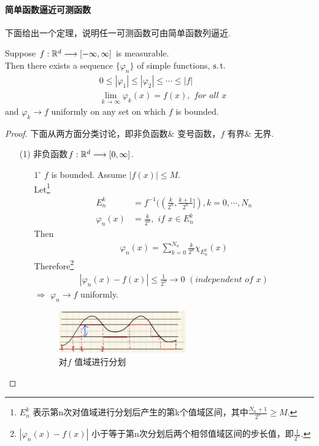 \paragraph{简单函数逼近可测函数}
	下面给出一个定理，说明任一可测函数可由简单函数列逼近.
	\begin{thm}\label{thm 2.2.1}
		Suppose $f : \mathbb{R}^d \longrightarrow [-\infty , \infty]$ is measurable. \\
		Then there exists a sequence $\{ \varphi_n \}$ of simple functions, $\operatorname{s.t.}$
		\begin{align}
			&0 \leq \left| \varphi_1 \right| \leq \left| \varphi_2 \right| \leq \cdots \leq \left| f \right| \\
			&\lim_{k \to \infty}{\varphi_{k}(x)} = f(x) , \,\, for \,\, all \,\, x
		\end{align}
		and $\varphi_k \to f$ uniformly on any set on which $f$ is bounded.
		
		\vspace{2em}
		\begin{proof}
			下面从两方面分类讨论，即非负函数$\&$ 变号函数，$f$ 有界$\&$ 无界.
			\begin{enumerate}
				\item[(1)]非负函数$f : \mathbb{R}^d \longrightarrow [0 , \infty]$.
				\begin{enumerate}
					\item[$1^{\circ}$]$f$ is bounded. Assume $\left| f(x) \right| \leq M$.\\
					Let\footnote{$E_{n}^k$ 表示第n次对值域进行分划后产生的第k个值域区间，其中$\frac{N_n + 1}{2^n} \geq M$.}
					\begin{align}
						E_{n}^{k} &= f^{-1}((\frac{k}{2^n} , \frac{k + 1}{2^n}]) , k = 0 , \cdots , N_n \\
						\varphi_{n}(x) &= \frac{k}{2^n} , \,\, if \,\, x \in E_{n}^{k}
					\end{align}
					Then
					\begin{align}
						\varphi_{n}(x) = \sum_{k = 0}^{N_n}{\frac{k}{2^n} \chi_{E_{n}^{k}}(x)}
					\end{align}
					Therefore\footnote{$\left| \varphi_{n}(x) - f(x) \right|$ 小于等于第n次分划后两个相邻值域区间的步长值，即$\frac{1}{2^n}$.}
					\begin{align}
						\left| \varphi_{n}(x) - f(x) \right| \leq \frac{1}{2^n} \to 0 \,\, (independent \,\, of \,\, x)
					\end{align}
					$\Rightarrow$ $\varphi_{n} \to f$ uniformly.
					
					\begin{figure}[htbp]  %
						\centering  %
						\includegraphics[width=0.55\textwidth]{figure/2.2-1} %
						\caption{对$f$ 值域进行分划} %
						\label{pic 2.1}
					\end{figure}
				

\end{enumerate}
\end{enumerate}
\end{proof}
\end{thm}
